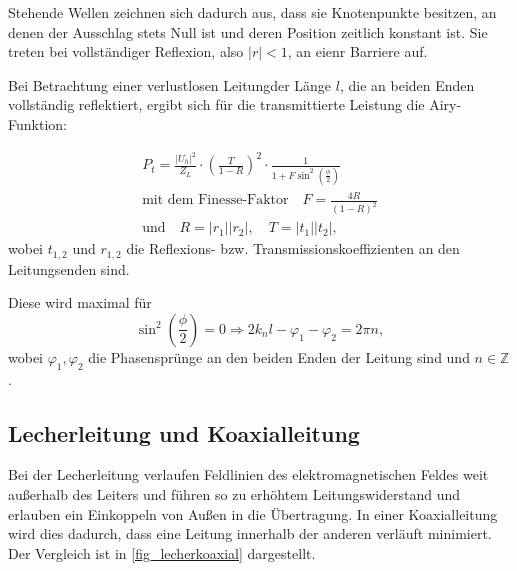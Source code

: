 \documentclass[
	a4paper,
	12pt,
	pagesize,
	ngerman
]{scrartcl}
\begin{document}
	Stehende Wellen zeichnen sich dadurch aus, dass sie Knotenpunkte besitzen, an denen der Ausschlag stets Null ist und deren Position zeitlich konstant ist.
	Sie treten bei vollständiger Reflexion, also $| r | < 1	$, an eienr Barriere auf.

	Bei Betrachtung einer verlustlosen Leitungder Länge $l$, die an beiden Enden vollständig reflektiert, ergibt sich für die transmittierte Leistung die Airy-Funktion:

	\begin{align}
		P_t = \frac{|U_h|^2}{Z_L} \cdot \left( \frac{T}{1-R} \right) ^2 \cdot \frac{1}{1+F \sin^2 \left( \frac{\phi}{2} \right) } \\
		\text{mit dem Finesse-Faktor} \quad F= \frac{4R}{(1-R)^2} \\
		\text{und} \quad R = |r_1 ||r_2 |, \quad T= |t_1||t_2|,
	\end{align}
	wobei $t_{1,2}$ und $r_{1,2}$ die Reflexions- bzw. Transmissionskoeffizienten an den Leitungsenden sind.

	Diese wird maximal für
	\begin{equation}
	\sin ^2 \left( \frac{\phi}{2} \right) = 0 \Rightarrow 2k_nl -\varphi_1 - \varphi_2 = 2\pi n,
	\end{equation}
	wobei $\varphi_1, \varphi_2 $ die Phasensprünge an den beiden Enden der Leitung sind und $n \in \mathbb{Z}$.

	\subsection{Lecherleitung und Koaxialleitung}
	Bei der Lecherleitung verlaufen Feldlinien des elektromagnetischen Feldes weit außerhalb des Leiters und führen so zu erhöhtem Leitungswiderstand und erlauben ein Einkoppeln von Außen in die Übertragung.
	In einer Koaxialleitung wird dies dadurch, dass eine Leitung innerhalb der anderen verläuft minimiert.
	Der Vergleich ist in \cref{fig_lecherkoaxial} dargestellt.
\end{document}
